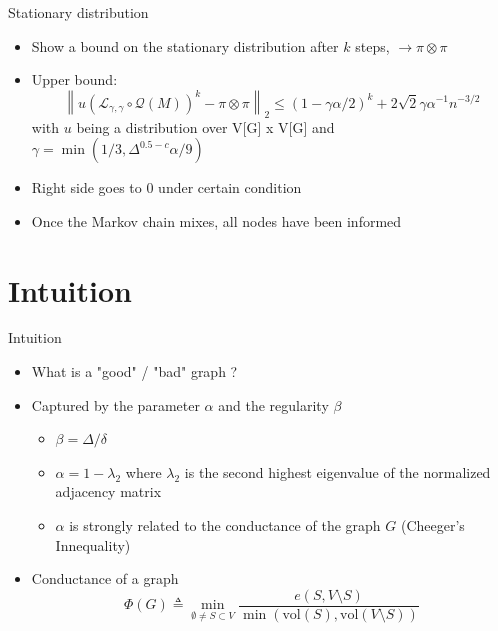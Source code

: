 \documentclass{beamer}
\newcommand{\norm}[1]{\left\lVert#1\right\rVert}
\begin{document}
\begin{frame}{Stationary distribution}
\begin{itemize}


 \item Show a bound on the stationary distribution after $k$ steps, $\to \pi \otimes \pi$

\item Upper bound:
\[
  \norm{u(\mathcal L_{\gamma,\gamma} \circ \mathcal Q(M))^k - \pi \otimes \pi}_2 \leq (1 - \gamma \alpha / 2)^k + 2 \sqrt 2 \gamma \alpha^{-1} n^{-3/2}
\]
with $u$ being a distribution over V[G] x V[G] and $\gamma = \min(1/3, \Delta^{0.5-c}\alpha/9)$

\item Right side goes to 0 under certain condition

\item Once the Markov chain mixes, all nodes have been informed

\end{itemize}
\end{frame}


\section{Intuition}

\frame{\sectionpage}

\begin{frame}{Intuition}
  \begin{itemize}
    \item What is a "good" / "bad" graph ? 

    \item Captured by the parameter $\alpha$ and the regularity $\beta$
    \begin{itemize}
      \item $\beta = \Delta / \delta$
      \item $\alpha = 1 - \lambda_2$ where $\lambda_2$ is the second highest eigenvalue of the normalized adjacency matrix
      \item $\alpha$ is strongly related to the conductance of the graph $G$ (Cheeger's Innequality)
    \end{itemize}

    \item Conductance of a graph
      \[
        \Phi(G) \triangleq \min_{\emptyset \not = S \subset V} \frac{e(S, V \setminus S)}{\min(\text{vol}(S), \text{vol}(V \setminus S))}
      \]
  \end{itemize}
\end{frame}
\end{document}
